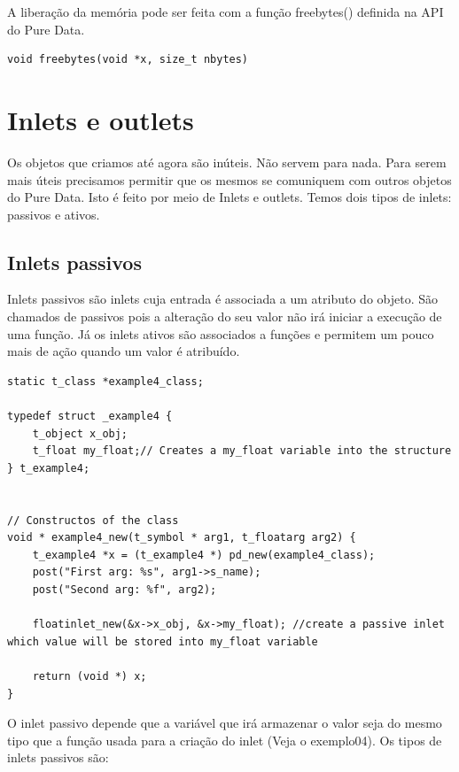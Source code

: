 \documentclass[10pt,a4paper]{report}
\begin{document}
A liberação da memória pode ser feita com a função freebytes() definida na API do Pure Data.

\begin{lstlisting}
void freebytes(void *x, size_t nbytes)
\end{lstlisting}


\chapter{Inlets e outlets}
Os objetos que criamos até agora são inúteis. Não servem para nada. Para serem mais úteis precisamos permitir que os mesmos se comuniquem com outros objetos do Pure Data. Isto é feito por meio de Inlets e outlets. Temos dois tipos de inlets: passivos e ativos. 

\section{Inlets passivos}
Inlets passivos são inlets cuja entrada é associada a um atributo do objeto. São chamados de passivos pois a alteração do seu valor não irá iniciar a execução de uma função. Já os inlets ativos são associados a funções e permitem um pouco mais de ação quando um valor é atribuído.

\begin{lstlisting}
static t_class *example4_class;

typedef struct _example4 {
    t_object x_obj;
    t_float my_float;// Creates a my_float variable into the structure
} t_example4;


// Constructos of the class
void * example4_new(t_symbol * arg1, t_floatarg arg2) {
    t_example4 *x = (t_example4 *) pd_new(example4_class);
    post("First arg: %s", arg1->s_name);
    post("Second arg: %f", arg2);

    floatinlet_new(&x->x_obj, &x->my_float); //create a passive inlet which value will be stored into my_float variable

    return (void *) x;
}
\end{lstlisting}

O inlet passivo depende que a variável que irá armazenar o valor seja do mesmo tipo que a função usada para a criação do inlet (Veja o exemplo04). Os tipos de inlets passivos são:
\end{document}
